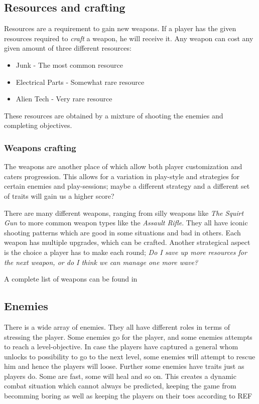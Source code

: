 \subsection{Resources and crafting}\label{gamedesign:ourgame:crafting}
Resources are a requirement to gain new weapons.
If a player has the given resources required to \emph{craft} a weapon, he will receive it.
Any weapon can cost any given amount of three different resources:
\begin{itemize}
\item Junk - The most common resource
\item Electrical Parts - Somewhat rare resource
\item Alien Tech - Very rare resource 
\end{itemize}
These resources are obtained by a mixture of shooting the enemies and completing objectives.\\

\subsubsection*{Weapons crafting}\label{gamedesign:ourgame:weapons}
The weapons are another place of which allow both player customization and caters progression. This allows for a variation in play-style and strategies for certain enemies and play-sessions; maybe a different strategy and a different set of traits will gain us a higher score?

There are many different weapons, ranging from silly weapons like \emph{The Squirt Gun} to more common weapon types like the \emph{Assault Rifle}.
They all have iconic shooting patterns which are good in some situations and bad in others.
Each weapon has multiple upgrades, which can be crafted.
Another strategical aspect is the choice a player has to make each round; \emph{Do I save up more resources for the next weapon, or do I think we can manage one more wave?} 

A complete list of weapons can be found in

\subsection{Enemies}
There is a wide array of enemies. They all have different roles in terms of stressing the player. Some enemies go for the player, and some enemies attempts to reach a level-objective. In case the players have captured a general whom unlocks to possibility to go to the next level, some enemies will attempt to rescue him and hence the players will loose. 
Further some enemies have traits just as players do. Some are fast, some will heal and so on. This creates a dynamic combat situation which cannot always be predicted, keeping the game from becomming boring as well as keeping the players on their toes according to REF

